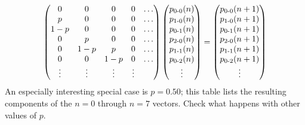 \begin{equation*}
  \begin{pmatrix}
    0      &0      &0      &0   &\ldots  \\
    p      &0      &0      &0   &\ldots  \\
    1-p    &0      &0      &0   &\ldots  \\
    0      &p      &0      &0   &\ldots  \\
    0      &1-p    &p      &0   &\ldots  \\
    0      &0      &1-p    &0   &\ldots  \\
    \vdots &\vdots &\vdots &\vdots
  \end{pmatrix}
  \begin{pmatrix} p_{\text{0-0}}(n) \\ p_{\text{1-0}}(n) \\ p_{\text{0-1}}(n) \\
           p_{\text{2-0}}(n) \\ p_{\text{1-1}}(n) \\ p_{\text{0-2}}(n) \\
  \vdots  \end{pmatrix}
  =
  \begin{pmatrix} p_{\text{0-0}}(n+1) \\ p_{\text{1-0}}(n+1) \\ p_{\text{0-1}}(n+1) \\
           p_{\text{2-0}}(n+1) \\ p_{\text{1-1}}(n+1) \\ p_{\text{0-2}}(n+1) \\
           \vdots  \end{pmatrix}
\end{equation*}
An especially interesting special case is $p=0.50$; this table lists the
resulting components of the $n=0$ through $n=7$ vectors. Check what happens with other values of $p$.


